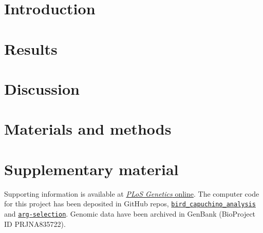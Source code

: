 \section{Introduction}


\section{Results}

\section{Discussion}

\section{Materials and methods}

\section{Supplementary material}
Supporting information is available at \href{https://journals.plos.org/PLOSGENETICS/article?id=10.1371/journal.pgen.1010474#sec017}{\textit{PLoS Genetics} online}. The computer code for this project has been deposited in GitHub repos, \href{https://github.com/CshlSiepelLab/bird_capuchino_analysis}{\texttt{bird\_capuchino\_analysis}} and \href{https://github.com/CshlSiepelLab/arg-selection}{\texttt{arg-selection}}. Genomic data have been archived in GenBank (BioProject ID PRJNA835722).